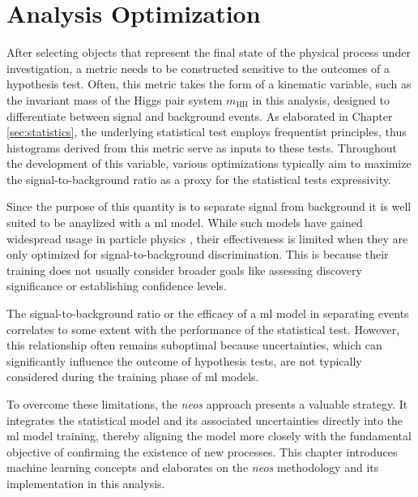 \chapter{Analysis Optimization}\label{sec:analysis_optimization}

After selecting objects that represent the final state of the physical process under investigation, a metric needs to be constructed sensitive to the outcomes of a hypothesis test. Often, this metric takes the form of a kinematic variable, such as the invariant mass of the Higgs pair system $m_\text{HH}$ in this analysis, designed to differentiate between signal and background events. As elaborated in Chapter \ref{sec:statistics}, the underlying statistical test employs frequentist principles, thus histograms derived from this metric serve as inputs to these tests. Throughout the development of this variable, various optimizations typically aim to maximize the signal-to-background ratio as a proxy for the statistical tests expressivity.

Since the purpose of this quantity is to separate signal from background it is well suited to be anaylized with a \ac{ml} model. While such models have gained widespread usage in particle physics \citep{albertsson2019machine,shlomi2020graph,feickert2021living,Schwartz2021Modern}, their effectiveness is limited when they are only optimized for signal-to-background discrimination. This is because their training does not usually consider broader goals like assessing discovery significance or establishing confidence levels.

The signal-to-background ratio or the efficacy of a \ac{ml} model in separating events correlates to some extent with the performance of the statistical test.  However, this relationship often remains suboptimal because uncertainties, which can significantly influence the outcome of hypothesis tests, are not typically considered during the training phase of \ac{ml} models.

To overcome these limitations, the \textit{\ac{neos}} approach \citep{Simpson_2023} presents a valuable strategy. It integrates the statistical model and its associated uncertainties directly into the \ac{ml} model training, thereby aligning the model more closely with the fundamental objective of confirming the existence of new processes. This chapter introduces machine learning concepts and elaborates on the \textit{\ac{neos}} methodology and its implementation in this analysis.

